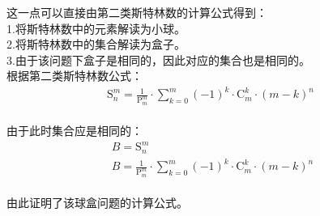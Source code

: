 \documentclass[UTF8]{ctexart}
\newcommand{\Pe}{\mathrm{P}}
\newcommand{\Co}{\mathrm{C}}
\newcommand{\St}{\mathrm{S}}
\begin{document}
    这一点可以直接由第二类斯特林数的计算公式得到：\\[3mm]
    1.将斯特林数中的元素解读为小球。\\[3mm]
    2.将斯特林数中的集合解读为盒子。\\[3mm]
    3.由于该问题下盒子是相同的，因此对应的集合也是相同的。\\[8mm]
    根据第二类斯特林数公式：
    \begin{align}
        \St_n^m=\frac{1}{\Pe_m^m}\cdot\sum_{k=0}^{m}(-1)^k\cdot\Co_m^k\cdot(m-k)^n
    \end{align}\\
    由于此时集合应是相同的：
    \begin{align}
        &B=\St_n^m\\[3mm]
        &B=\frac{1}{\Pe_m^m}\cdot\sum_{k=0}^{m}(-1)^k\cdot\Co_m^k\cdot(m-k)^n~~
    \end{align}\\
    由此证明了该球盒问题的计算公式。

\newpage
\end{document}
